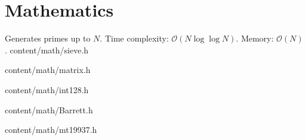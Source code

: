 \section{Mathematics}

{Generates primes up to $N$. Time complexity: $\mathcal{O}(N \log \log N)$. Memory: $\mathcal{O}(N)$.}
{content/math/sieve.h}

{}
{content/math/matrix.h}

{}
{content/math/int128.h}

{}
{content/math/Barrett.h}

{}
{content/math/mt19937.h}
